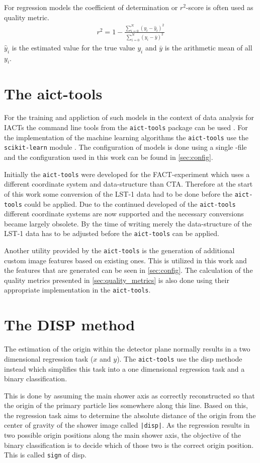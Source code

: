 For regression models the coefficient of determination or $r^2$-score is often used as quality metric.
\begin{align}
    r^2 = 1 - \frac{\sum_{i = 0}^N (y_i - \hat{y}_i)^2}{\sum_{i = 0}^N (y_i - \bar{y})^2}
\end{align}
$\hat{y}_i$ is the estimated value for the true value $y_i$ and $\bar{y}$ is the arithmetic mean of all $y_i$.


\section{The aict-tools}
For the training and appliction of such models in the context of data analysis for IACTs the command line tools from the \texttt{aict-tools} package can be used \cite{aict-tools}. 
For the implementation of the machine learning algorithms the \texttt{aict-tools} use the \texttt{scikit-learn} module \cite{scikit-learn}.
The configuration of models is done using a single -file and the configuration used in this work can be found in \autoref{sec:config}.

Initially the \texttt{aict-tools} were developed for the FACT-experiment which uses a different coordinate system and data-structure than CTA.
Therefore at the start of this work some conversion of the LST-1 data had to be done before the \texttt{aict-tools} could be applied.
Due to the continued developed of the \texttt{aict-tools} different coordinate systems are now supported and the necessary conversions became largely obsolete.
By the time of writing merely the data-structure of the LST-1 data has to be adjusted before the \texttt{aict-tools} can be applied.

Another utility provided by the \texttt{aict-tools} is the generation of additional custom image features based on existing ones.
This is utilized in this work and the features that are generated can be seen in \autoref{sec:config}. 
The calculation of the quality metrics presented in \autoref{sec:quality_metrics} is also done using their appropriate implementation in the \texttt{aict-tools}.


\section{The DISP method}
The estimation of the origin within the detector plane normally results in a two dimensional regression task ($x$ and $y$).
The \texttt{aict-tools} use the disp methode instead which simplifies this task into a one dimensional regression task and a binary classification.

This is done by assuming the main shower axis as correctly reconstructed so that the origin of the primary particle lies somewhere along this line.
Based on this, the regression task aims to determine the absolute distance of the origin from the center of gravity of the shower image called \texttt{|disp|}.
As the regression results in two possible origin positions along the main shower axis, the objective of the binary classification is to decide which
of those two is the correct origin position.
This is called \texttt{sign} of disp.
